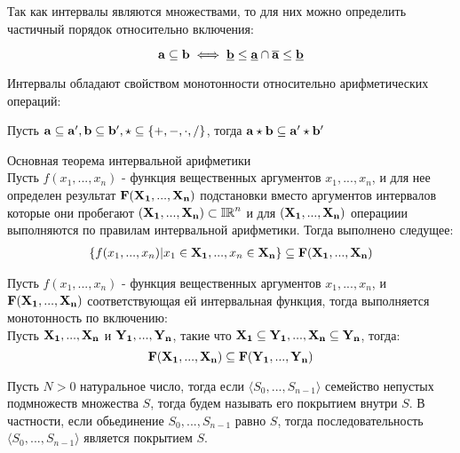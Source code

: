\begin{remark*}
Так как интервалы являются множествами, то для них можно определить частичный порядок относительно включения:

$$\bold{a} \subseteq \bold{b} \iff \bold{\underline{b}} \leq \bold{\underline{a}} \cap \bold{\overline{a}} \leq \bold{\underline{b}}$$

\end{remark*}

\begin{property*}
Интервалы обладают свойством монотонности относительно арифметических операций:

Пусть $\bold{a} \subseteq \bold{a'}, \bold{b} \subseteq \bold{b'}, \star \subseteq \{+, -, \cdot, /\}$, тогда $\bold{a} \star \bold{b} \subseteq \bold{a'} \star \bold{b'}$
\end{property*}

\begin{theorem*}{Основная теорема интервальной арифметики}\\
Пусть $f(x_1, ..., x_n)$ - функция вещественных аргументов $x_1, ..., x_n$, и для нее определен результат $\bold{F(X_1, ..., X_n)}$ подстановки вместо аргументов интервалов которые они пробегают $\bold{(X_1, ..., X_n)} \subset \mathbb{IR}^n$ и для $\bold{(X_1, ..., X_n)}$ операциии выполняются по правилам интервальной арифметики. Тогда выполнено следущее:
    \begin{gather*}
        \{f(x_1,...,x_n) | x_1 \in \bold{X_1},...,x_n \in \bold{X_n}\} \subseteq \bold{F(\bold{X_1},...,\bold{X_n}})
    \end{gather*}
\end{theorem*}


\begin{proposition*}
Пусть $f(x_1, ..., x_n)$ - функция вещественных аргументов $x_1, ..., x_n$, и $\bold{F(X_1, ..., X_n)}$ соответствующая ей интервальная функция, тогда выполняется монотонность по включению:\\
Пусть $\bold{X_1},...,\bold{X_n}$ и $\bold{Y_1},...,\bold{Y_n}$, такие что $\bold{X_1} \subseteq \bold{Y_1},...,\bold{X_n} \subseteq \bold{Y_n}$, тогда:
$$\bold{F(X_1, ..., X_n)} \subseteq \bold{F(Y_1, ..., Y_n)}$$
\end{proposition*}

\begin{definition*}
Пусть $N > 0$  натуральное число, тогда если $\langle S_0,..., S_{n-1} \rangle$ семейство непустых подмножеств множества $S$, тогда будем называть его покрытием внутри $S$. В частности, если обьединение $S_0,..., S_{n-1}$ равно $S$, тогда последовательность $\langle S_0,..., S_{n-1} \rangle$ является покрытием $S$.
\end{definition*}


